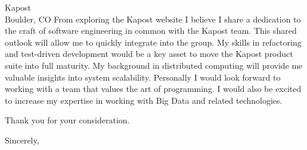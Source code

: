 \documentclass{letter}
\begin{document}
\begin{letter}{Kapost\\Boulder, CO}
From exploring the Kapost website I believe I share a dedication
to the craft of software engineering in common with the Kapost team.
This shared outlook will allow me to quickly integrate into the
group. My skills in refactoring and test-driven development would
be a key asset to move the Kapost product suite into full maturity.
My background in distributed computing will provide me valuable
insights into system scalability. Personally I would look forward
to working with a team that values the art of programming. I would
also be excited to increase my expertise in working with Big Data
and related technologies.

Thank you for your consideration.

\closing{Sincerely,}
\end{letter}
\end{document}
